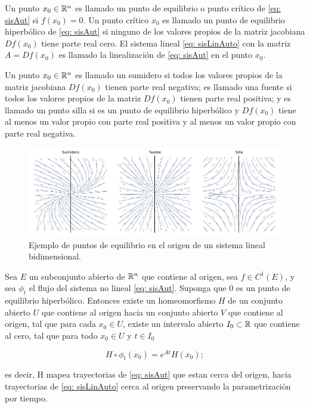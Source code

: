 \begin{defi}
	Un punto $x_{0} \in {\mathbb{R}}^{n}$ es llamado un punto de equilibrio o punto crítico de \eqref{eq: sisAut} si $f(x_{0})=0$. Un punto crítico $x_{0}$ es llamado un punto de equilibrio hiperbólico de \eqref{eq: sisAut} si ninguno de los valores propios de la matriz jacobiana $Df(x_{0})$ tiene parte real cero. El sistema lineal \eqref{eq: sisLinAuto} con la matriz $A = Df(x_{0})$ es llamado la linealización de \eqref{eq: sisAut} en el punto $x_{0}$.
\end{defi}

\begin{defi}
	Un punto $x_{0} \in {\mathbb{R}}^{n}$ es llamado un sumidero si todos los valores propios de la matriz jacobiana $Df(x_{0})$ tienen parte real negativa; es llamado una fuente si todos los valores propios de la matriz $Df(x_{0})$ tienen parte real positiva; y es llamado un punto silla si es un punto de equilibrio hiperbólico y $Df(x_{0})$ tiene al menos un valor propio con parte real positiva y al menos un valor propio con parte real negativa.
\end{defi}

\begin{figure}
	\centering
	\includegraphics[width=1\textwidth]{img/EquilibriumPoints.pdf}
	\caption{Ejemplo de puntos de equilibrio en el origen de un sistema lineal bidimensional.}
	\label{fig: EquilibriumPoints}
\end{figure}

\begin{teo}\label{teo: hartman}
	Sea $E$ un subconjunto abierto de ${\mathbb{R}}^{n}$ que contiene al origen, sea $f \in C^{1}(E)$, y sea $\phi_{t}$ el flujo del sistema no lineal \eqref{eq: sisAut}. Suponga que $0$ es un punto de equilibrio hiperbólico. Entonces existe un homeomorfismo $H$ de un conjunto abierto $U$ que contiene al origen hacia un conjunto abierto $V$ que contiene al origen, tal que para cada $x_{0} \in U$, existe un intervalo abierto $I_{0} \subset {\mathbb{R}}$ que contiene al cero, tal que para todo $x_{0} \in U$ y $t \in I_{0}$
	
	\begin{equation}
		H \circ \phi_{t}(x_{0}) = e^{At}H(x_{0});
	\end{equation}
	
	es decir, H mapea trayectorias de \eqref{eq: sisAut} que estan cerca del origen, hacia trayectorias de \eqref{eq: sisLinAuto} cerca al origen preservando la parametrización por tiempo.
\end{teo}

